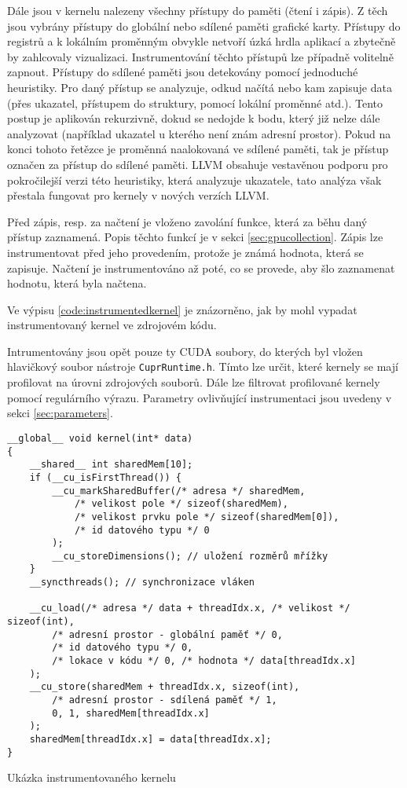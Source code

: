 Dále jsou v kernelu nalezeny všechny přístupy do paměti (čtení i zápis). Z těch jsou vybrány přístupy do globální nebo sdílené paměti grafické karty. Přístupy do registrů a k lokálním proměnným obvykle netvoří úzká hrdla aplikací a zbytečně by zahlcovaly vizualizaci. Instrumentování těchto přístupů lze případně volitelně zapnout. Přístupy do sdílené paměti jsou detekovány pomocí jednoduché heuristiky. Pro daný přístup se analyzuje, odkud načítá nebo kam zapisuje data (přes ukazatel, přístupem do struktury, pomocí lokální proměnné atd.). Tento postup je aplikován rekurzivně, dokud se nedojde k bodu, který již nelze dále analyzovat (například ukazatel u kterého není znám adresní prostor). Pokud na konci tohoto řetězce je proměnná naalokovaná ve sdílené paměti, tak je přístup označen za přístup do sdílené paměti. LLVM obsahuje vestavěnou podporu pro pokročilejší verzi této heuristiky, která analyzuje ukazatele, tato analýza však přestala fungovat pro kernely v nových verzích LLVM.

Před zápis, resp. za načtení je vloženo zavolání funkce, která za běhu daný přístup zaznamená. Popis těchto funkcí je v sekci \ref{sec:gpucollection}. Zápis lze instrumentovat před jeho provedením, protože je známá hodnota, která se zapisuje. Načtení je instrumentováno až poté, co se provede, aby šlo zaznamenat hodnotu, která byla načtena.

Ve výpisu \ref{code:instrumentedkernel} je znázorněno, jak by mohl vypadat instrumentovaný kernel ve zdrojovém kódu.
    
Intrumentovány jsou opět pouze ty CUDA soubory, do kterých byl vložen hlavičkový soubor nástroje \texttt{CuprRuntime.h}. Tímto lze určit, které kernely se mají profilovat na úrovni zdrojových souborů. Dále lze filtrovat profilované kernely pomocí regulárního výrazu. Parametry ovlivňující instrumentaci jsou uvedeny v sekci \ref{sec:parameters}.

\begin{listing}
\begin{verbatim}
__global__ void kernel(int* data)
{
    __shared__ int sharedMem[10];
    if (__cu_isFirstThread()) {
        __cu_markSharedBuffer(/* adresa */ sharedMem,
            /* velikost pole */ sizeof(sharedMem),
            /* velikost prvku pole */ sizeof(sharedMem[0]),
            /* id datového typu */ 0
        );
        __cu_storeDimensions(); // uložení rozměrů mřížky
    }
    __syncthreads(); // synchronizace vláken
    
    __cu_load(/* adresa */ data + threadIdx.x, /* velikost */ sizeof(int),
        /* adresní prostor - globální paměť */ 0,
        /* id datového typu */ 0,
        /* lokace v kódu */ 0, /* hodnota */ data[threadIdx.x]
    );
    __cu_store(sharedMem + threadIdx.x, sizeof(int),
        /* adresní prostor - sdílená paměť */ 1,
        0, 1, sharedMem[threadIdx.x]
    );
    sharedMem[threadIdx.x] = data[threadIdx.x];
}
\end{verbatim}
\caption{Ukázka instrumentovaného kernelu}
\label{code:instrumentedkernel}
\end{listing}

